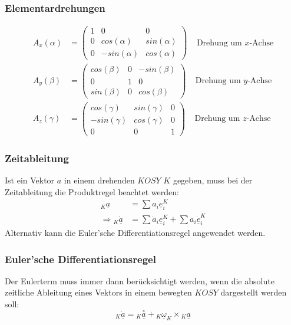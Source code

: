 \documentclass[a4paper,twocolumn,10pt]{article}
\begin{document}
\subsubsection{Elementardrehungen}
\begin{equation*}
\begin{split}
A_x(\alpha)&=\begin{pmatrix}1 & 0 & 0 \\ 0 & cos(\alpha) & sin(\alpha) \\ 0 & -sin(\alpha) & cos(\alpha)\end{pmatrix}\;\;\;\;\text{Drehung um }x\text{-Achse}\\
A_y(\beta)&=\begin{pmatrix}cos(\beta) & 0 & -sin(\beta) \\ 0 & 1 & 0 \\ sin(\beta) & 0 & cos(\beta)\end{pmatrix}\;\;\;\;\text{Drehung um }y\text{-Achse}\\
A_z(\gamma)&=\begin{pmatrix}cos(\gamma) & sin(\gamma) & 0 \\ -sin(\gamma) & cos(\gamma) & 0 \\ 0 & 0 & 1\end{pmatrix}\;\;\;\;\text{Drehung um }z\text{-Achse}
\end{split}
\end{equation*}

\subsubsection{Zeitableitung}
Ist ein Vektor $a$ in einem drehenden $KOSY$ $K$ gegeben, muss bei der Zeitableitung die Produktregel beachtet werden:
\begin{equation*}
\begin{split}
{}_K\underline{a}&=\sum a_i\underline{e}_i^K\\
\Rightarrow {}_K\underline{\dot{a}}&=\sum \dot{a}_i\underline{e}_i^K+\sum a_i\underline{\dot{e}}_i^K
\end{split}
\end{equation*}
Alternativ kann die Euler'sche Differentiationsregel angewendet werden.

\subsubsection{Euler'sche Differentiationsregel}
Der Eulerterm muss immer dann berücksichtigt werden, wenn die absolute zeitliche Ableitung eines Vektors in einem bewegten $KOSY$ dargestellt werden soll:
\begin{equation*}
{}_K\underline{\dot{a}}={}_K\underline{\overset{\circ}{a}}+{}_K\underline{\omega}_K\times {}_K\underline{a}
\end{equation*}
\end{document}

